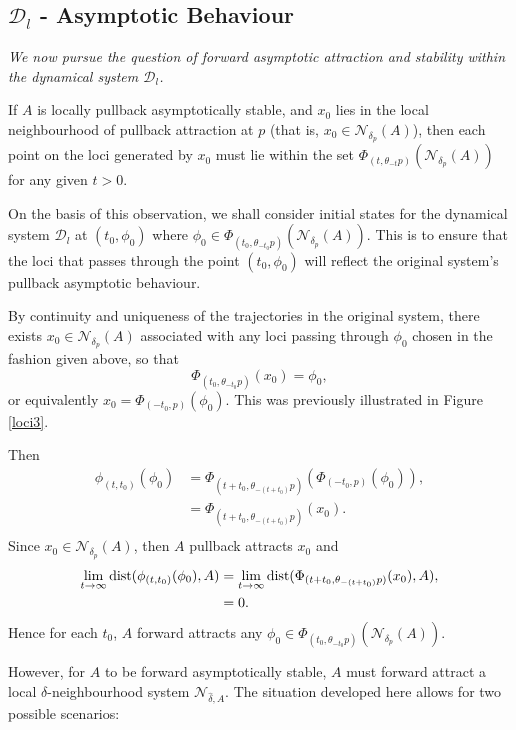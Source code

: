 \subsection{$\mathcal{D}_l$ - Asymptotic Behaviour}
\label{ssecLoci2}

\textit{We now pursue the question of forward asymptotic attraction and
stability within the dynamical system $\mathcal{D}_l$.}

If $A$ is locally pullback asymptotically stable, and $x_0$ lies in the
local neighbourhood of pullback attraction at $p$ (that is, $x_0 \in
\mathcal{N}_{\delta_p}(A)$), then each point on the loci generated by $x_0$ must
lie within the set $\Phi_{(t, \theta_{-t}p)} (\mathcal{N}_{\delta_p} (A))$ for
any given $t > 0$.

On the basis of this observation, we shall consider initial states for
the dynamical system $\mathcal{D}_l$ at $(t_0, \phi_0)$ where $\phi_0 \in
\Phi_{(t_0, \theta_{-t_0}p)} (\mathcal{N}_{\delta_p} (A))$. This is to ensure
that the loci that passes through the point $(t_0, \phi_0)$ will reflect the
original system's pullback asymptotic behaviour.

By continuity and uniqueness of the trajectories in the original
system, there exists $x_0 \in \mathcal{N}_{\delta_p}(A)$
associated with any loci passing through $\phi_0$ chosen in the fashion given
above, so that
\[ \Phi_{(t_0, \theta_{-t_0}p)}(x_0) = \phi_0, \]
or equivalently $x_0 = \Phi_{(-t_0, p)}(\phi_0)$. This was previously
illustrated in Figure \ref{loci3}.

Then
\begin{align*}
  \phi_{(t, t_0)}(\phi_0) &= \Phi_{(t +t_0,\theta_{-(t+t_0)}p)}(\Phi_{(-t_0,p)}
           (\phi_0) ), \\
  &= \Phi_{(t +t_0,\theta_{-(t+t_0)}p)}(x_0). \\
\end{align*}
Since $x_0 \in \mathcal{N}_{\delta_p}(A)$, then $A$ pullback attracts $x_0$ and
\begin{align*}
  \lim_{t \to \infty} {\rm dist}(\phi_{(t, t_0)}(\phi_0),A) &= \lim_{t \to \infty}
             {\rm dist}(\Phi_{(t +t_0,\theta_{-(t+t_0)}p)}(x_0),A), \\
  &= 0.  \\
\end{align*}
Hence for each $t_0$, $A$ forward attracts any $\phi_0 \in \Phi_{(t_0,
\theta_{-t_0}p)}(\mathcal{N}_{\delta_p}(A))$.

However, for $A$ to be forward asymptotically stable, $A$ must
forward attract a local $\delta$-neighbourhood system
$\mathcal{N}_{\hat{\delta}, A}$. The situation developed here allows for two
possible scenarios:

